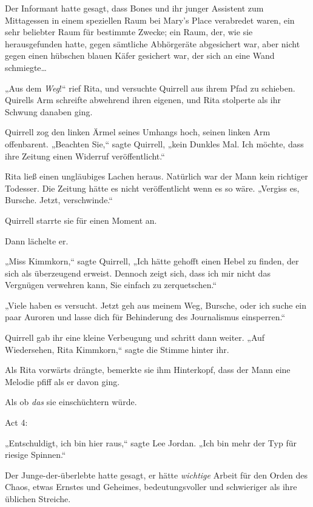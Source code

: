 {Der Informant hatte gesagt, dass Bones und ihr junger Assistent zum Mittagessen in einem speziellen Raum bei Mary's Place verabredet waren, ein sehr beliebter Raum für bestimmte Zwecke; ein Raum, der, wie sie herausgefunden hatte, gegen sämtliche Abhörgeräte abgesichert war, aber nicht gegen einen hübschen blauen Käfer gesichert war, der sich an eine Wand schmiegte…

„Aus dem \emph{Weg}!“ rief Rita, und versuchte Quirrell aus ihrem Pfad zu schieben. Quirells Arm schreifte abwehrend ihren eigenen, und Rita stolperte als ihr Schwung danaben ging.

Quirrell zog den linken Ärmel seines Umhangs hoch, seinen linken Arm offenbarent. „Beachten Sie,“ sagte Quirrell, „kein Dunkles Mal. Ich möchte, dass ihre Zeitung einen Widerruf veröffentlicht.“

Rita ließ einen ungläubiges Lachen heraus. Natürlich war der Mann kein richtiger Todesser. Die Zeitung hätte es nicht veröffentlicht wenn es so wäre. „Vergiss es, Bursche. Jetzt, verschwinde.“

Quirrell starrte sie für einen Moment an.

Dann lächelte er.

„Miss Kimmkorn,“ sagte Quirrell, „Ich hätte gehofft einen Hebel zu finden, der sich als überzeugend erweist. Dennoch zeigt sich, dass ich mir nicht das Vergnügen verwehren kann, Sie einfach zu zerquetschen.“

„Viele haben es versucht. Jetzt geh aus meinem Weg, Bursche, oder ich suche ein paar Auroren und lasse dich für Behinderung des Journalismus einsperren.“

Quirrell gab ihr eine kleine Verbeugung und schritt dann weiter. „Auf Wiedersehen, Rita Kimmkorn,“ sagte die Stimme hinter ihr.

Als Rita vorwärts drängte, bemerkte sie ihm Hinterkopf, dass der Mann eine Melodie pfiff als er davon ging.

Als ob \emph{das} sie einschüchtern würde.

Act 4:

„Entschuldigt, ich bin hier raus,“ sagte Lee Jordan. „Ich bin mehr der Typ für riesige Spinnen.“

Der Junge-der-überlebte hatte gesagt, er hätte \emph{wichtige} Arbeit für den Orden des Chaos, etwas Ernstes und Geheimes, bedeutungsvoller und schwieriger als ihre üblichen Streiche.

}
